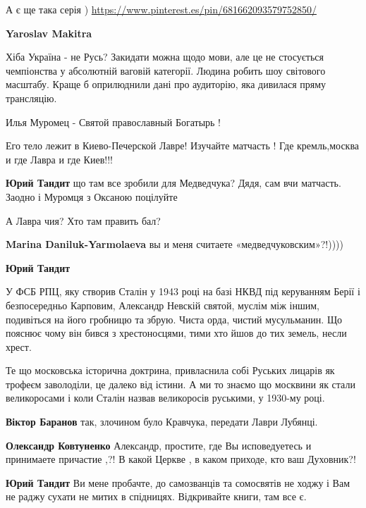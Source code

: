 \begin{itemize}
\begin{itemize}
А є ще така серія )
\url{https://www.pinterest.es/pin/681662093579752850/}

\textbf{Yaroslav Makitra} 

Хіба Україна - не Русь? Закидати можна щодо мови, але це не стосується
чемпіонства у абсолютній ваговій категорії. Людина робить шоу світового
масштабу. Краще б оприлюднили дані про аудиторію, яка дивилася пряму
трансляцію.

\end{itemize} %


Илья Муромец - Святой православный Богатырь !

Его тело лежит в Киево-Печерской Лавре! Изучайте матчасть ! Где кремль,москва и
где Лавра и где Киев!!!

\begin{itemize} %
\textbf{Юрий Тандит} що там все зробили для Медведчука? Дядя, сам вчи матчасть. Заодно і Муромця з Оксаною поцілуйте

А Лавра чия? Хто там править бал?

\textbf{Marina Daniluk-Yarmolaeva} вы и меня считаете «медведчуковским»?!))))

\textbf{Юрий Тандит} 

У ФСБ РПЦ, яку створив Сталін у 1943 році на базі НКВД під керуванням Берії і
безпосередньо Карповим, Александр Невскій святой, муслім між іншим, подивіться
на його гробницю та збрую. Чиста орда, чистий мусульманин. Що пояснює чому він
бився з хрестоносцями, тими хто йшов до тих земель, несли хрест.

Те що московська історична доктрина, привласнила собі Руських лицарів як
трофеєм заволоділи, це далеко від істини. А ми то знаємо що москвини як стали
великоросами і коли Сталін назвав великоросів руськими, у 1930-му році.


\textbf{Віктор Баранов} так, злочином було Кравчука, передати Лаври Лубянці.

\textbf{Олександр Ковтуненко} Александр, простите, где Вы исповедуетесь и принимаете причастие ,?!
В какой Церкве , в каком приходе, кто ваш Духовник?!

\textbf{Юрий Тандит} Ви мене пробачте, до самозванців та сомосвятів не ходжу і Вам не раджу сухати не митих в спідницях. Відкривайте книги, там все є.


\end{itemize}
\end{itemize}
